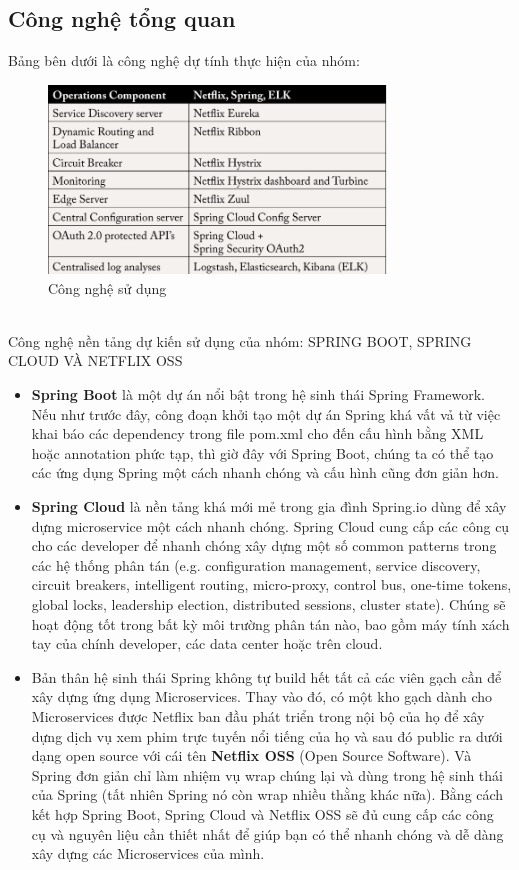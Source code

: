 		\subsection{Công nghệ tổng quan}
		Bảng bên dưới là công nghệ dự tính thực hiện của nhóm:
		\begin{figure}[!ht]
			\includegraphics[width=0.8\textwidth]{Images/tech.png}
			\centering
			\linebreak
			\caption{Công nghệ sử dụng}
		\end{figure}\\
		Công nghệ nền tảng dự kiến sử dụng của nhóm: SPRING BOOT, SPRING CLOUD VÀ NETFLIX OSS
		\begin{itemize}
		    \item \textbf{Spring Boot} là một dự án nổi bật trong hệ sinh thái Spring Framework. Nếu như trước đây, công đoạn khởi tạo một dự án Spring khá vất vả từ việc khai báo các dependency trong file pom.xml cho đến cấu hình bằng XML hoặc annotation phức tạp, thì giờ đây với Spring Boot, chúng ta có thể tạo các ứng dụng Spring một cách nhanh chóng và cấu hình cũng đơn giản hơn.
		    \item \textbf{Spring Cloud} là nền tảng khá mới mẻ trong gia đình Spring.io dùng để xây dựng microservice một cách nhanh chóng. Spring Cloud cung cấp các công cụ cho các developer để nhanh chóng xây dựng một số common patterns trong các hệ thống phân tán (e.g. configuration management, service discovery, circuit breakers, intelligent routing, micro-proxy, control bus, one-time tokens, global locks, leadership election, distributed sessions, cluster state). Chúng sẽ hoạt động tốt trong bất kỳ môi trường phân tán nào, bao gồm máy tính xách tay của chính developer, các data center hoặc trên cloud.
		    \item Bản thân hệ sinh thái Spring không tự build hết tất cả các viên gạch cần để xây dựng ứng dụng Microservices. Thay vào đó, có một kho gạch dành cho Microservices được Netflix ban đầu phát triển trong nội bộ của họ để xây dựng dịch vụ xem phim trực tuyến nổi tiếng của họ và sau đó public ra dưới dạng open source với cái tên \textbf{Netflix OSS} (Open Source Software). Và Spring đơn giản chỉ làm nhiệm vụ wrap chúng lại và dùng trong hệ sinh thái của Spring (tất nhiên Spring nó còn wrap nhiều thằng khác nữa). Bằng cách kết hợp Spring Boot, Spring Cloud và Netflix OSS sẽ đủ cung cấp các công cụ và nguyên liệu cần thiết nhất để giúp bạn có thể nhanh chóng và dễ dàng xây dựng các Microservices của mình.
		\end{itemize}

